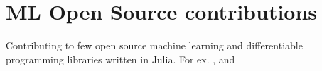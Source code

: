 \documentclass[]{deedy-resume-openfont}
\begin{document}
\begin{minipage}[t]{0.66\textwidth}


\section{ML Open Source contributions}
\vspace{\topsep}
Contributing to few open source machine learning and differentiable programming libraries written in Julia. For ex.
\href{https://github.com/FluxML/Flux.jl}{}, \href{https://github.com/FluxML/Zygote.jl}{}
and \href{https://github.com/JuliaDiff/ChainRules.jl}{}
\sectionsep


%


\end{minipage}
\end{document}
